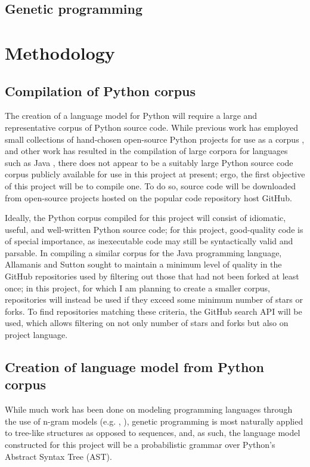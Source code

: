 \documentclass[a4paper,11pt]{proposal}
\begin{document}
\subsection{Genetic programming}

\section{Methodology} \label{sec:disc}

\subsection{Compilation of Python corpus}
The creation of a language model for Python will require a large and representative corpus of Python source code. While previous work has employed small collections of hand-chosen open-source Python projects for use as a corpus \cite{tu2014} \cite{caliskan2015}, and other work has resulted in the compilation of large corpora for languages such as Java \cite{allamanis2013}, there does not appear to be a suitably large Python source code corpus publicly available for use in this project at present; ergo, the first objective of this project will be to compile one. To do so, source code will be downloaded from open-source projects hosted on the popular code repository host GitHub. 

Ideally, the Python corpus compiled for this project will consist of idiomatic, useful, and well-written Python source code; for this project, good-quality code is of special importance, as inexecutable code may still be syntactically valid and parsable. In compiling a similar corpus for the Java programming language, Allamanis and Sutton \cite{allamanis2013} sought to maintain a minimum level of quality in the GitHub repositories used by filtering out those that had not been forked at least once; in this project, for which I am planning to create a smaller corpus, repositories will instead be used if they exceed some minimum number of stars or forks. To find repositories matching these criteria, the GitHub search API will be used, which allows filtering on not only number of stars and forks but also on project language.

\subsection{Creation of language model from Python corpus}

While much work has been done on modeling programming languages through the use of n-gram models (e.g. \cite{hindle2012}, \cite{allamanis2013}), genetic programming is most naturally applied to tree-like structures as opposed to sequences, and, as such, the language model constructed for this project will be a probabilistic grammar over Python's Abstract Syntax Tree (AST).
\end{document}
